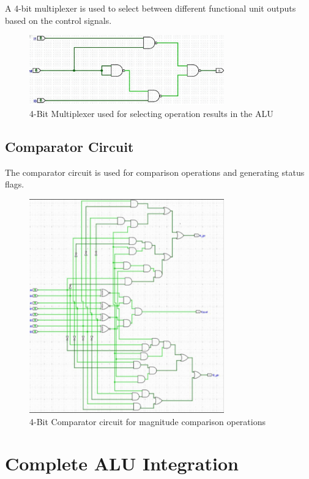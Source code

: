 A 4-bit multiplexer is used to select between different functional unit outputs based on the control signals.

\begin{figure}[h]
    \centering
    \includegraphics[width=0.75\textwidth]{4-bit-multiplexer}
    \caption{4-Bit Multiplexer used for selecting operation results in the ALU}
    \label{fig:4bit-mux}
\end{figure}

\subsection{Comparator Circuit}

The comparator circuit is used for comparison operations and generating status flags.

\begin{figure}[h]
    \centering
    \includegraphics[width=0.75\textwidth]{4-bit-comparator}
    \caption{4-Bit Comparator circuit for magnitude comparison operations}
    \label{fig:4bit-comparator}
\end{figure}

\section{Complete ALU Integration}

